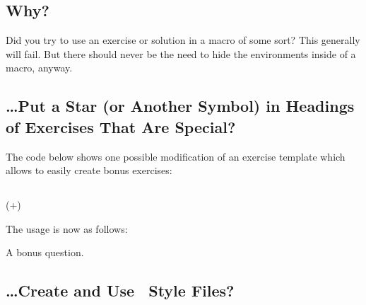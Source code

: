 \documentclass{xsim-manual}
\begin{document}
\subsection{ Why?}
Did you try to use an exercise or solution in a macro of some sort?  This
generally will fail.  But there should never be the need to hide the
environments inside of a macro, anyway.

\subsection{\dots Put a Star (or Another Symbol) in Headings of Exercises That
  Are Special?}

The code below shows one possible modification of an exercise template which
allows to easily create bonus exercises:
\begin{sourcecode}
  \usepackage{amsymb}
    {%
      \subsection*
        {%
          \XSIMmixedcase{\GetExerciseName}\nobreakspace
          \IfInsideSolutionF
            {%
                { {\normalfont\itshape{}}}%
            }%
        }
        {%
          \marginpar
            {%
              \IfInsideSolutionF{\rule{1.2cm}{1pt}\slash}%
              \PropertyValue
                {\nobreakspace(+\PropertyValue)}%
              \nobreakspace{}%
            }%
        }%
    }
    {}
\end{sourcecode}

The usage is now as follows:
\begin{example}
  \begin{exercise}[bonus]
    A bonus question.
  \end{exercise}
\end{example}

\subsection{\dots Create and Use \xsim\ Style Files?}\label{sec:style-files}
\end{document}
